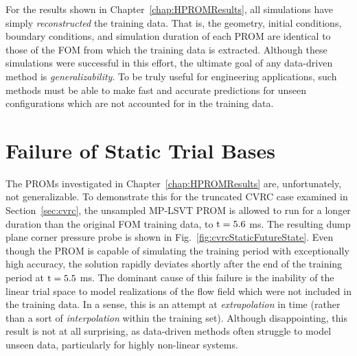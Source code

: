 For the results shown in Chapter~\ref{chap:HPROMResults}, all simulations have simply \textit{reconstructed} the training data. That is, the geometry, initial conditions, boundary conditions, and simulation duration of each PROM are identical to those of the FOM from which the training data is extracted. Although these simulations were successful in this effort, the ultimate goal of any data-driven method is \textit{generalizability}. To be truly useful for engineering applications, such methods must be able to make fast and accurate predictions for unseen configurations which are not accounted for in the training data. 

\section{Failure of Static Trial Bases}

The PROMs investigated in Chapter~\ref{chap:HPROMResults} are, unfortunately, not generalizable. To demonstrate this for the truncated CVRC case examined in Section~\ref{sec:cvrc}, the unsampled MP-LSVT PROM is allowed to run for a longer duration than the original FOM training data, to $\text{t} = 5.6$ ms. The resulting dump plane corner pressure probe is shown in Fig.~\ref{fig:cvrcStaticFutureState}. Even though the PROM is capable of simulating the training period with exceptionally high accuracy, the solution rapidly deviates shortly after the end of the training period at $\text{t} = 5.5$ ms. The dominant cause of this failure is the inability of the linear trial space to model realizations of the flow field which were not included in the training data. In a sense, this is an attempt at \textit{extrapolation} in time (rather than a sort of \textit{interpolation} within the training set). Although disappointing, this result is not at all surprising, as data-driven methods often struggle to model unseen data, particularly for highly non-linear systems.

